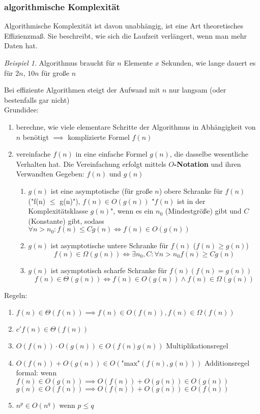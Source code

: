 \documentclass[a4paper]{scrartcl}
\DeclareMathOperator{\Exists}{\exists}%
\DeclareMathOperator{\Forall}{\forall}%
\theoremstyle{definition}
\theoremstyle{plain}
\theoremstyle{remark}
\theoremstyle{remark}
\newtheorem{ex}{Beispiel}
\begin{document}
\subsubsection{algorithmische Komplexität}
\label{sec-15-1-2}
Algorithmische Komplexität ist davon unabhängig, ist eine Art theoretisches Effizienzmaß. Sie
beschreibt, wie sich die Laufzeit verlängert, wenn man mehr Daten hat.

\begin{ex}
Algorithmus braucht für $n$ Elemente $x$ Sekunden, wie lange dauert es für $2n$, $10n$ für große $n$
\end{ex}
Bei effiziente Algorithmen steigt der Aufwand mit $n$ nur langsam (oder bestenfalls gar nicht) \\
    Grundidee:
\begin{enumerate}
\item berechne, wie viele elementare Schritte der Algorithmus in Abhängigkeit von $n$ benötigt $\implies$ komplizierte Formel $f(n)$
\item vereinfache $f(n)$ in eine einfache Formel $g(n)$, die dasselbe wesentliche Verhalten hat. Die Vereinfachung erfolgt mittels \textbf{$O$-Notation} und ihren Verwandten
Gegeben: $f(n)$ und $g(n)$
\begin{enumerate}
\item $g(n)$ ist eine asymptotische (für große $n$) obere Schranke für $f(n)$ ("f(n) $\le$ g(n)"), $f(n) \in O(g(n))$ "$f(n)$ ist in der Komplexitätsklasse $g(n)$", wenn es ein $n_0$ (Mindestgröße) gibt
und $C$ (Konstante) gibt, sodass $\Forall n > n_0: f(n) \leq C g(n) \iff f(n) \in O(g(n))$
\item $g(n)$ ist asymptotische untere Schranke für $f(n)$ ($f(n) \geq g(n)$)
\[f(n) \in \Omega(g(n)) \iff \Exists n_0,C : \Forall n > n_0 f(n) \geq C g(n)\]
\item $g(n)$ ist asymptotisch scharfe Schranke für $f(n) (f(n) = g(n))$
          \[f(n) \in \Theta(g(n)) \iff f(n) \in O(g(n)) \wedge f(n) \in \Omega(g(n))\]
\end{enumerate}
\end{enumerate}
Regeln:
\begin{enumerate}
\item $f(n) \in \Theta(f(n)) \implies f(n) \in O(f(n)), f(n) \in \Omega(f(n))$
\item $c' f(n) \in \Theta(f(n))$
\item $O(f(n)) \cdot O(g(n)) \in O(f(n) g(n))$ \hfill Multiplikationsregel
\item $O(f(n)) + O(g(n)) \in O(\text{"max"}(f(n), g(n)))$ \hfill Additionsregel \\
       formal: wenn $f(n) \in O(g(n)) \implies O(f(n)) + O(g(n)) \in O(g(n))$ \\
       $g(n) \in O(f(n)) \implies O(f(n)) + O(g(n)) \in O(f(n))$
\item $n^p \in O(n^q)$ wenn $p \leq q$
\end{enumerate}
\end{document}
